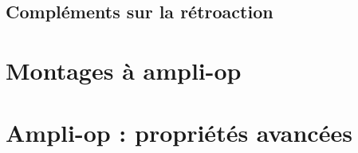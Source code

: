 \subsection{Compléments sur la rétroaction}




\section{Montages à ampli-op}
\section{Ampli-op : propriétés avancées}
